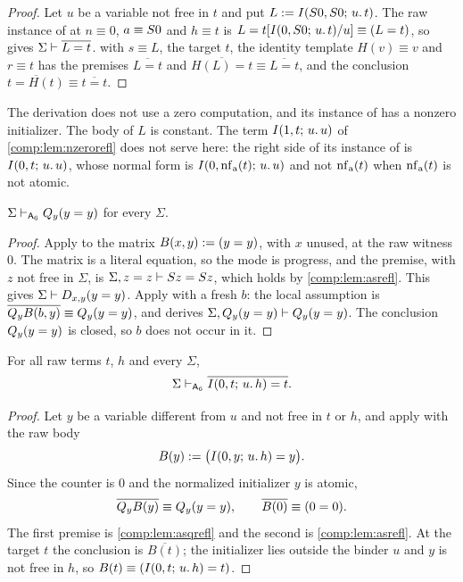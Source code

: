 \begin{proof}
Let $u$ be a variable not free in $t$ and put $L\mathrel{:=}I(S0,S0;\,u.\,t)$.
The raw instance of  at $n\equiv0$, $a\equiv S0$ and $h\equiv t$
is $L=t[I(0,S0;\,u.\,t)/u]\equiv(L=t)$, so  gives
$\Sigma\vdash\overline{L=t}$.  with $s\equiv L$, the target
$t$, the identity template $H(v)\equiv v$ and $r\equiv t$ has the premises
$\overline{L=t}$ and $\overline{H(L)=t}\equiv\overline{L=t}$, and the
conclusion $\overline{t=H(t)}\equiv\overline{t=t}$.
\end{proof}

The derivation does not use a zero computation, and its instance of
 has a nonzero initializer. The body of $L$ is constant. The
term $I(1,t;\,u.\,u)$ of \cref{comp:lem:nzerorefl} does not serve here: the
right side of its instance of  is $I(0,t;\,u.\,u)$, whose normal
form is $I(0,\operatorname{nf}_{\mathrm a}(t);\,u.\,u)$ and not $\operatorname{nf}_{\mathrm a}(t)$ when
$\operatorname{nf}_{\mathrm a}(t)$ is not atomic.

\begin{lemma}
\label{comp:lem:asqrefl}
$\Sigma\vdash_{\mathsf{A}_6}Q_{y}(y=y)$ for every $\Sigma$.
\end{lemma}

\begin{proof}
Apply  to the matrix $B(x,y)\mathrel{:=}(y=y)$, with $x$ unused, at
the raw witness $0$. The matrix is a literal equation, so the mode is
progress, and the premise, with $z$ not free in $\Sigma$, is
$\Sigma,z=z\vdash S z=S z$, which holds by \cref{comp:lem:asrefl}. This gives $\Sigma\vdash D_{x,y}(y=y)$. Apply
 with a fresh $b$: the local assumption is
$\overline{Q_{y}B(b,y)}\equiv Q_{y}(y=y)$, and  derives
$\Sigma,Q_{y}(y=y)\vdash Q_{y}(y=y)$. The conclusion $Q_{y}(y=y)$ is closed,
so $b$ does not occur in it.
\end{proof}

\begin{theorem}
\label{comp:thm:asizero}
For all raw terms $t$, $h$ and every $\Sigma$,
\[
 \Sigma\vdash_{\mathsf{A}_6}\overline{I(0,t;\,u.\,h)=t}.
\]
\end{theorem}

\begin{proof}
Let $y$ be a variable different from $u$ and not free in $t$ or $h$, and
apply  with the raw body
\[
 B(y)\mathrel{:=}\bigl(I(0,y;\,u.\,h)=y\bigr).
\]
Since the counter is $0$ and the normalized initializer $y$ is atomic,
\[
 \overline{Q_{y}B(y)}\equiv Q_{y}(y=y),
 \qquad
 \overline{B(0)}\equiv(0=0).
\]
The first premise is \cref{comp:lem:asqrefl} and the second is
\cref{comp:lem:asrefl}. At the target $t$ the conclusion is
$\overline{B(t)}$; the initializer lies outside the binder $u$ and $y$ is not
free in $h$, so $B(t)\equiv(I(0,t;\,u.\,h)=t)$.
\end{proof}

